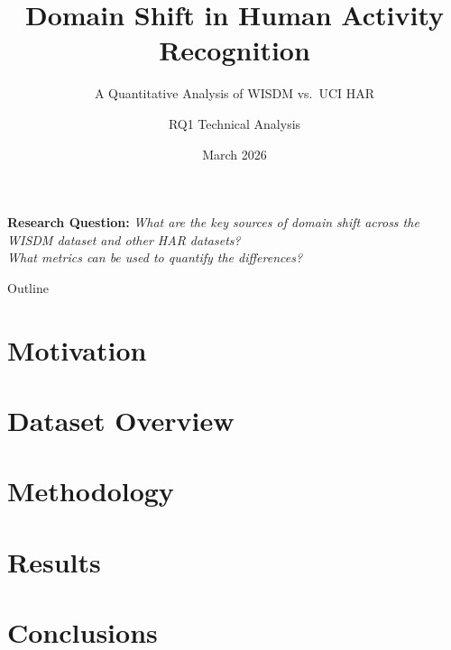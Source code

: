 \documentclass[aspectratio=169, 10pt]{beamer}
\title[Domain Shift in HAR]{Domain Shift in Human Activity Recognition}
\subtitle{A Quantitative Analysis of WISDM vs.\ UCI HAR}
\author{RQ1 Technical Analysis}
\institute{Sensor Data Analytics / Machine Learning Systems}
\date{March 2026}
\begin{document}
\begin{frame}
  \titlepage
  \vspace{-4mm}
  \begin{center}
    \small\textcolor{noteGray}{
      \textbf{Research Question:} \emph{What are the key sources of domain shift across
      the WISDM dataset and other HAR datasets?\\
      What metrics can be used to quantify the differences?}}
  \end{center}
\end{frame}

\begin{frame}{Outline}
  \tableofcontents[hideallsubsections]
\end{frame}

\section{Motivation}
\section{Dataset Overview}
\section{Methodology}
\section{Results}
\section{Conclusions}

\end{document}

